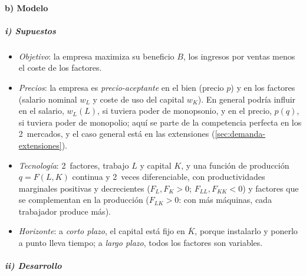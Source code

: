 \documentclass[11pt]{article}
\begin{document}
\paragraph{b) Modelo}\label{sec:demanda-modelo}

\subparagraph{i) Supuestos}

\begin{itemize}
\item \emph{Objetivo}: la empresa maximiza su beneficio $B$, los ingresos por ventas menos el coste de los factores.
\item \emph{Precios}: la empresa es \emph{precio-aceptante} en el bien (precio $p$) y en los factores (salario nominal $w_L$ y coste de uso del capital $w_K$). En general podría influir en el salario, $w_L(L)$, si tuviera poder de monopsonio, y en el precio, $p(q)$, si tuviera poder de monopolio; aquí se parte de la competencia perfecta en los 2~mercados, y el caso general está en las extensiones (\ref{sec:demanda-extensiones}).
\item \emph{Tecnología}: 2~factores, trabajo $L$ y capital $K$, y una función de producción $q=F(L,K)$ continua y 2~veces diferenciable, con productividades marginales positivas y decrecientes ($F_L,F_K>0$; $F_{LL},F_{KK}<0$) y factores que se complementan en la producción ($F_{LK}>0$: con más máquinas, cada trabajador produce más).
\item \emph{Horizonte}: a \emph{corto plazo}, el capital está fijo en $\overline{K}$, porque instalarlo y ponerlo a punto lleva tiempo; a \emph{largo plazo}, todos los factores son variables.
\end{itemize}

\subparagraph{ii) Desarrollo}
\end{document}

